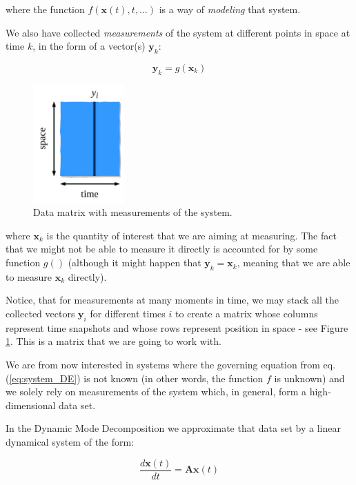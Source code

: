 \documentclass[10pt,twocolumn]{article}
\begin{document}
where the function $f(\mathbf{x}(t), t, \dots)$ is a way of \textit{modeling} that system.

We also have collected \textit{measurements} of the system at different points in space at time $k$, in the form of a vector(s) $\mathbf{\mathbf{y}}_k$:

\begin{equation}
\mathbf{\mathbf{y}}_k = g(\mathbf{x}_k)
\end{equation}

\begin{figure}
\centering\includegraphics[width=3.5cm]{data-matrix.png}
\caption{Data matrix with measurements of the system.}
\label{fig:data-matrix}
\end{figure}

where $\mathbf{x}_k$ is the quantity of interest that we are aiming at measuring. The fact that we might not be able to measure it directly is accounted for by some function $g()$ (although it might happen that $\mathbf{y}_k = \mathbf{x}_k$, meaning that we are able to measure $\mathbf{x}_k$ directly).

Notice, that for measurements at many moments in time, we may stack all the collected vectors $\mathbf{y}_i$ for different times $i$ to create a matrix whose columns represent time snapshots and whose rows represent position in space - see Figure \ref{fig:data-matrix}. This is a matrix that we are going to work with.

We are from now interested in systems where the governing equation from eq.(\ref{eq:system_DE}) is not known (in other words, the function $f$ is unknown) and we solely rely on measurements of the system which, in general, form a high-dimensional data set.

In the Dynamic Mode Decomposition we approximate that data set by a linear dynamical system of the form:

\begin{equation} \label{eq:system_linear}
\frac{d \mathbf{x}(t)}{dt} = \mathbf{A} \mathbf{x}(t)
\end{equation}
\end{document}
